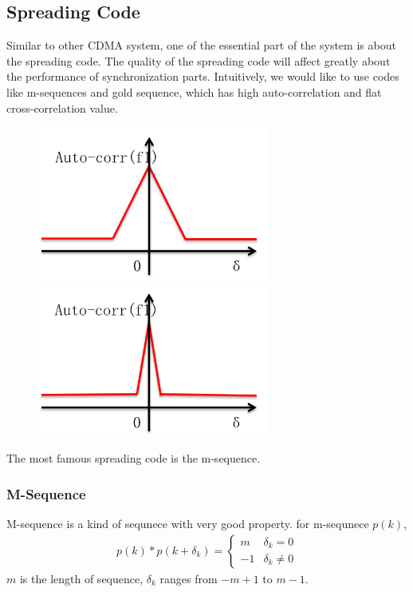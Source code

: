 \documentclass[a4paper]{report}
\begin{document}
\subsection{Spreading Code} %
\label{sub:spreading_code}

Similar to other CDMA system, one of the essential part of the system is about the spreading code. The quality of the spreading code will affect greatly about the performance of synchronization parts. Intuitively, we would like to use codes like m-sequences and gold sequence, which has high auto-correlation and flat cross-correlation value.

\begin{figure}
	\includegraphics[width = 3in]{figure/bad_correlation.png}
	\includegraphics[width = 3in]{figure/good_correlation.png}
\end{figure}

The most famous spreading code is the m-sequence. 
\subsubsection{M-Sequence} %
\label{ssub:m_sequence}

M-sequence is a kind of sequnece with very good property. for m-sequnece $p(k)$, 
\begin{align}
	p(k) \ast p(k+\delta_k) = 
	\begin{cases}
	m    & \delta_k = 0\\
	-1	 & \delta_k \neq 0
	\end{cases}
\end{align}
$m$ is the length of sequence, $\delta_k$ ranges from $-m+1$ to $m-1$.
\end{document}
